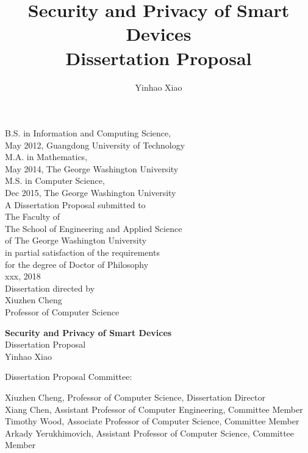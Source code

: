 \documentclass[letterpaper,12pt]{article}
\begin{document}
   \author{{\normalsize Yinhao Xiao}}
   \title{\Large{\bf Security and Privacy of Smart Devices} \\ \large Dissertation Proposal}
   \date{}
   \maketitle
   \thispagestyle{empty}
   \begin{center}
       B.S. in Information and Computing Science,\\ May 2012, Guangdong University of Technology \\
       M.A. in Mathematics,\\ May 2014, The George Washington University \\
       M.S. in Computer Science,\\ Dec 2015, The George Washington University \\[\baselineskip]
       
       A Dissertation Proposal submitted to\\
       The Faculty of\\The School of Engineering and Applied Science\\ of The George
       Washington University\\ in partial satisfaction of the requirements\\ for the degree
       of Doctor of Philosophy\\[\baselineskip]
       xxx, 2018\\[\baselineskip]
       Dissertation directed by\\[\baselineskip]
       Xiuzhen Cheng\\Professor of Computer Science
   \end{center}
   \pagestyle{plain}
   \setcounter{page}{1}


   \newpage
   \doublespacing
   \begin{center}
   {\Large{\bf Security and Privacy of Smart Devices}\\ \large Dissertation Proposal}\\[\baselineskip]
   {\normalsize Yinhao Xiao}
   \end{center}
   \noindent Dissertation Proposal Committee:\\

   \hfill\begin{minipage}{5in}
   {Xiuzhen Cheng, Professor of Computer Science, Dissertation
       Director}\\[\baselineskip]
   {Xiang Chen, Assistant Professor of Computer Engineering, Committee Member}\\[\baselineskip]
   {Timothy Wood, Associate Professor of Computer Science, Committee Member}\\[\baselineskip]
   {Arkady Yerukhimovich, Assistant Professor of Computer Science, Committee Member}\\[\baselineskip]
   
   \end{minipage}
\end{document}
